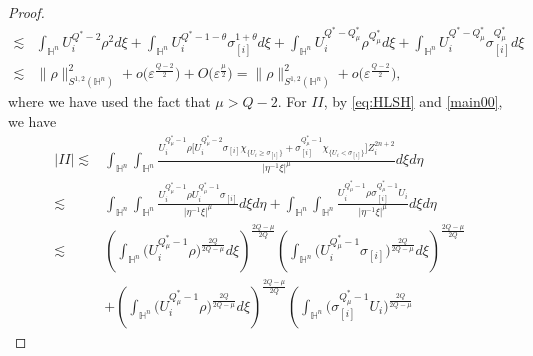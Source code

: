 \documentclass[11pt]{article}
\begin{document}
\begin{proof}
\begin{align}
\lesssim&\int_{\mathbb{H}^{n}}U_i^{Q^{\ast}-2}\rho^2
d\xi+\int_{\mathbb{H}^{n}}U_i^{Q^{\ast}-1-\theta}\sigma^{1+\theta}_{[i]}
d\xi+\int_{\mathbb{H}^{n}}U_i^{Q^*-Q_\mu^{\ast}}\rho^{Q^{\ast}_{\mu}}
d\xi+\int_{\mathbb{H}^{n}}U_i^{Q^*-Q_\mu^{\ast}}\sigma_{[i]}^{Q^{\ast}_{\mu}}
d\xi \nonumber\\
\lesssim& \|\rho\|_{S^{1,2}(\mathbb{H}^{n})}^2
+o\Big(\varepsilon^{\frac{Q-2}{2}}\Big)+O\big(\varepsilon^{\frac{\mu}{2}}\big)=\|\rho\|_{S^{1,2}(\mathbb{H}^{n})}^2
+o\Big(\varepsilon^{\frac{Q-2}{2}}\Big),
\end{align}
where we have used the fact that $\mu>Q-2$.
For $II$, by \eqref{eq:HLSH} and \eqref{main00}, we have
\begin{align}\label{main43}
  |II|%
\lesssim&\int_{\mathbb{H}^{n}}\int_{\mathbb{H}^{n}}
\frac{ U_i^{Q^{\ast}_{\mu}-1}\rho\Big[U_i^{Q^{\ast}_{\mu}-2}\sigma_{[i]}
\chi_{\{U_i\geq \sigma_{[i]}\}}+\sigma_{[i]}^{Q^{\ast}_{\mu}-1}\chi_{\{U_i< \sigma_{[i]}\}}\Big] Z_i^{2n+2}}
{|\eta^{-1}\xi|^{\mu}} d\xi{d}\eta \nonumber\\
\lesssim&\int_{\mathbb{H}^{n}}\int_{\mathbb{H}^{n}}
\frac{U_i^{Q^{\ast}_{\mu}-1}\rho U_i^{Q^{\ast}_{\mu}-1}\sigma_{[i]}
}
{|\eta^{-1}\xi|^{\mu}} d\xi{d}\eta+\int_{\mathbb{H}^{n}}\int_{\mathbb{H}^{n}}
\frac{U_i^{Q^{\ast}_{\mu}-1}\rho \sigma_{[i]}^{Q^{\ast}_{\mu}-1}U_i
}
{|\eta^{-1}\xi|^{\mu}} d\xi{d}\eta \nonumber\\
\lesssim&\left(\int_{\mathbb{H}^{n}}\bigg(U_i^{Q^{\ast}_{\mu}-1}\rho\bigg)^{\frac{2Q}{2Q-\mu}} d\xi\right)^{\frac{2Q-\mu}{2Q}}\left(\int_{\mathbb{H}^{n}}\bigg(U_i^{Q^{\ast}_{\mu}-1}\sigma_{[i]}\bigg)^{\frac{2Q}{2Q-\mu}} %
 d\xi\right)^{\frac{2Q-\mu}{2Q}} \nonumber\\
&+\left(\int_{\mathbb{H}^{n}}\bigg(U_i^{Q^{\ast}_{\mu}-1}\rho\bigg)^{\frac{2Q}{2Q-\mu}} d\xi\right)^{\frac{2Q-\mu}{2Q}}\left(\int_{\mathbb{H}^{n}}\bigg(\sigma_{[i]}^{Q^{\ast}_{\mu}-1}U_i\bigg)^{\frac{2Q}{2Q-\mu}} %

\end{align}
\end{proof}
\end{document}
